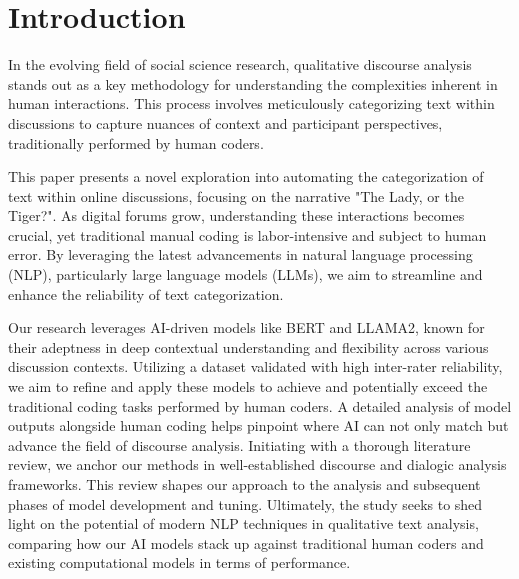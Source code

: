 \documentclass[fleqn,moreauthors,10pt]{ds_report}
\affiliation{\textit{Advisors: Slavko Žitnik}}
\begin{document}
\flushbottom 

\maketitle 

\thispagestyle{empty} 


\section*{Introduction}
In the evolving field of social science research, qualitative discourse analysis stands out as a key methodology for understanding the complexities inherent in human interactions. This process involves meticulously categorizing text within discussions to capture nuances of context and participant perspectives, traditionally performed by human coders.

This paper presents a novel exploration into automating the categorization of text within online discussions, focusing on the narrative "The Lady, or the Tiger?". As digital forums grow, understanding these interactions becomes crucial, yet traditional manual coding is labor-intensive and subject to human error. By leveraging the latest advancements in natural language processing (NLP), particularly large language models (LLMs), we aim to streamline and enhance the reliability of text categorization.

Our research leverages AI-driven models like BERT and LLAMA2, known for their adeptness in deep contextual understanding and flexibility across various discussion contexts. Utilizing a dataset validated with high inter-rater reliability, we aim to refine and apply these models to achieve and potentially exceed the traditional coding tasks performed by human coders. A detailed analysis of model outputs alongside human coding helps pinpoint where AI can not only match but advance the field of discourse analysis. Initiating with a thorough literature review, we anchor our methods in well-established discourse and dialogic analysis frameworks. This review shapes our approach to the analysis and subsequent phases of model development and tuning. Ultimately, the study seeks to shed light on the potential of modern NLP techniques in qualitative text analysis, comparing how our AI models stack up against traditional human coders and existing computational models in terms of performance.
\end{document}
